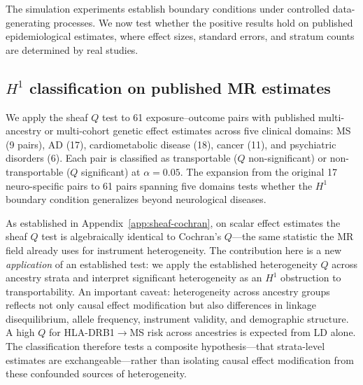 \documentclass{article}
\begin{document}
The simulation experiments establish boundary conditions under controlled data-generating processes. We now test whether the positive results hold on published epidemiological estimates, where effect sizes, standard errors, and stratum counts are determined by real studies.

\subsection{$H^1$ classification on published MR estimates}
\label{sec:realdata-h1}

We apply the sheaf $Q$ test to 61 exposure--outcome pairs with published multi-ancestry or multi-cohort genetic effect estimates across five clinical domains: MS (9 pairs), AD (17), cardiometabolic disease (18), cancer (11), and psychiatric disorders (6). Each pair is classified as transportable ($Q$ non-significant) or non-transportable ($Q$ significant) at $\alpha = 0.05$. The expansion from the original 17 neuro-specific pairs to 61 pairs spanning five domains tests whether the $H^1$ boundary condition generalizes beyond neurological diseases.

As established in Appendix~\ref{app:sheaf-cochran}, on scalar effect estimates the sheaf $Q$ test is algebraically identical to Cochran's $Q$---the same statistic the MR field already uses for instrument heterogeneity.
The contribution here is a new \emph{application} of an established test: we apply the established heterogeneity $Q$ across ancestry strata and interpret significant heterogeneity as an $H^1$ obstruction to transportability.
An important caveat: heterogeneity across ancestry groups reflects not only causal effect modification but also differences in linkage disequilibrium, allele frequency, instrument validity, and demographic structure.
A high $Q$ for HLA-DRB1$\to$MS risk across ancestries is expected from LD alone.
The classification therefore tests a composite hypothesis---that strata-level estimates are exchangeable---rather than isolating causal effect modification from these confounded sources of heterogeneity.
\end{document}
